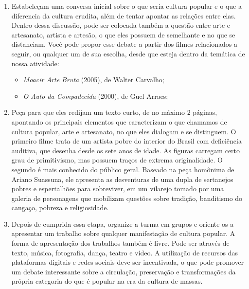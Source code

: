 \documentclass[12pt]{extarticle}
\begin{document}
\begin{enumerate}
\item
Estabeleçam uma conversa inicial sobre o que
seria cultura popular e o que a diferencia da cultura erudita, além de
tentar apontar as relações entre elas. Dentro dessa discussão, pode ser
colocada também a questão entre arte e artesanato, artista e artesão, o
que eles possuem de semelhante e no que se distanciam. Você pode propor
esse debate a partir dos filmes relacionados a seguir, ou qualquer um de
sua escolha, desde que esteja dentro da temática de nossa atividade:

\begin{itemize}
\item
  \emph{Moacir Arte Bruta} (2005), de Walter Carvalho;
\item
  \emph{O Auto da Compadecida} (2000), de Guel Arraes;
\end{itemize}

\item
Peça para que eles redijam um texto curto, de no máximo 2 páginas,
apontando os principais elementos que caracterizam o que chamamos de
cultura popular, arte e artesanato, no que eles dialogam e se
distinguem. O primeiro filme trata de um artista pobre do interior do
Brasil com deficiência auditiva, que desenha desde os sete anos de
idade. As figuras carregam certo grau de primitivismo, mas possuem
traços de extrema originalidade. O segundo é mais conhecido do público
geral. Baseado na peça homônima de Ariano Suassuna, ele apresenta as
desventuras de uma dupla de sertanejos pobres e espertalhões para
sobreviver, em um vilarejo tomado por uma galeria de personagens que
mobilizam questões sobre tradição, banditismo do cangaço, pobreza e
religiosidade.

\item
Depois de cumprida essa etapa, organize a turma em grupos e
oriente-os a apresentar um trabalho sobre qualquer manifestação de
cultura popular. A forma de apresentação dos trabalhos também é livre.
Pode ser através de texto, música, fotografia, dança, teatro e vídeo. A
utilização de recursos das plataformas digitais e redes sociais deve ser
incentivada, o que pode promover um debate interessante sobre a
circulação, preservação e transformações da própria categoria do que é
popular na era da cultura de massas.
\end{enumerate}

\end{document}
